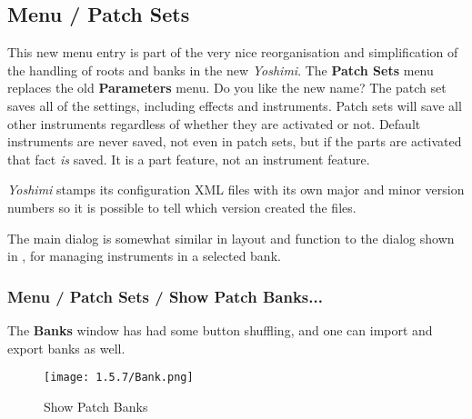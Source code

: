 %
%
%

\subsection{Menu / Patch Sets}
\label{subsubsec:menu_patch_sets}

   This new menu entry is part of the very nice reorganisation and simplification
   of the handling of roots and banks in the new \textsl{Yoshimi}.  The
   \textbf{Patch Sets} menu replaces the old \textbf{Parameters} menu.  Do you
   like the new name?  The patch set saves all of the settings, including effects
   and instruments.  Patch sets will save all other instruments regardless of
   whether they are activated or not.  Default instruments are never saved, not
   even in patch sets, but if the parts are activated that fact \textsl{is}
   saved.  It is a part feature, not an instrument feature.

   \textsl{Yoshimi} stamps its configuration XML files with its own major and
   minor version numbers so it is possible to tell which version created the
   files.

   The main dialog is somewhat similar in layout and function to the
   dialog shown in
   ,
   for managing instruments in a selected bank.

\subsubsection{Menu / Patch Sets / Show Patch Banks...}
\label{subsubsec:menu_patch_sets_show_patch_banks}

   The \textbf{Banks} window has had some button shuffling, and one can
   import and export banks as well.

\begin{figure}[H]
   \centering
   \texttt{[image: 1.5.7/Bank.png]}
   \caption[Show Patch Banks]{Show Patch Banks}
   \label{fig:show_patch_banks}
\end{figure}

